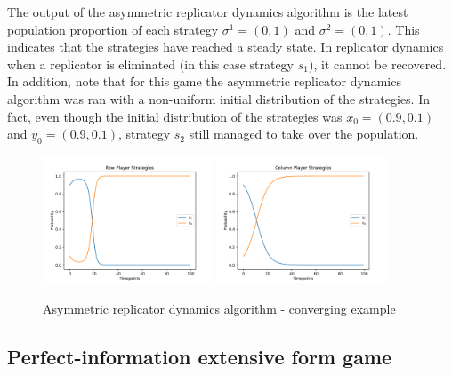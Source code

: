 The output of the asymmetric replicator dynamics algorithm is the latest
population proportion of each strategy \(\sigma^1 = (0, 1)\) and
\(\sigma^2 = (0, 1)\).
This indicates that the strategies have reached a steady state.
In replicator dynamics when a replicator is eliminated (in this case strategy
\(s_1\)), it cannot be recovered.
In addition, note that for this game the asymmetric replicator dynamics
algorithm was ran with a non-uniform initial distribution of the strategies.
In fact, even though the initial distribution of the strategies was
\(x_0 = (0.9, 0.1)\) and \(y_0 = (0.9, 0.1)\), strategy \(s_2\) still managed
to take over the population.

\begin{figure}[H]
    \centering
    \includegraphics[width=0.45\textwidth]{chapters/04_game_theoretic_model/img/learning_algorithms_example/asymmetric_rd_2_row.pdf}
    \includegraphics[width=0.45\textwidth]{chapters/04_game_theoretic_model/img/learning_algorithms_example/asymmetric_rd_2_col.pdf}
    \caption{Asymmetric replicator dynamics algorithm - converging example}
    \label{fig:asymmetric_replicator_dynamics_steady}
\end{figure}


\subsection{Perfect-information extensive form game}

